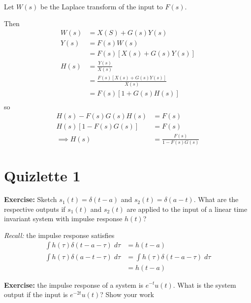 \documentclass[12pt]{report}
\newenvironment*{exercise}[1][red]{
    \begin{tcolorbox}[
        parbox=false,
        colback=#1!5!white,
        colframe=#1!75!black,
        breakable
    ]}
    {\end{tcolorbox}}
\begin{document}
Let $W(s)$ be the Laplace transform of the input to $F(s)$. 

Then 
\begin{align*}
    W(s) &= X(S) + G(s) Y(s)\\
    Y(s) &= F(s) W(s)\\
    &= F(s) \left[X(s) + G(s) Y(s)\right]\\
    H(s) &= \frac{Y(s)}{X(s)}\\ 
    &= \frac{F(s)\left[X(s) + G(s) Y(s)\right] }{X(s)}\\ 
    &= F(s) \left[1 + G(s) H(s)\right]\\ 
\end{align*}
so 
\begin{align*}
    H(s) - F(s) G(s) H(s) &= F(s)\\
    H(s) \left[1 - F(s) G(s)\right] &= F(s)\\
    \implies H(s) &= \frac{F(s)}{1 - F(s) G(s)}
\end{align*}

\section{Quizlette 1}

\begin{exercise}
    \textbf{Exercise:} Sketch $s_1(t) = \delta(t - a)$ and $s_2(t) = \delta(a - t)$. What are the respective outputs if $s_1(t)$ and $s_2(t)$ are applied to the input of a linear time invariant system with impulse response $h(t)$?
\end{exercise}

\begin{center}
\end{center}

\emph{Recall:} the impulse response satisfies 
\begin{align*}
    \int h(\tau) \delta(t - a - \tau)\; d\tau &= h(t - a)\\ 
    \int h(\tau) \delta(a - t - \tau)\; d\tau &= \int h(\tau) \delta(t - a - \tau)\; d\tau \\ 
    &= h(t - a)
\end{align*}

\begin{exercise}
    \textbf{Exercise:} the impulse response of a system is $e^{-t}u(t)$. What is the system output if the input is $e^{-2t}u(t)$? Show your work
\end{exercise}
\end{document}
